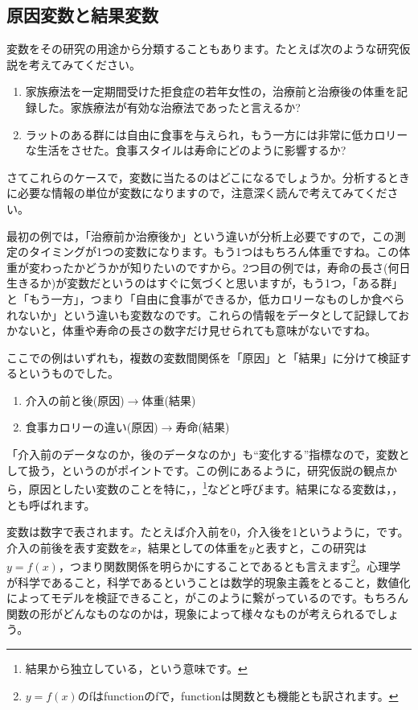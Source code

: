 \documentclass{ltjsbook}
\begin{document}
\subsection{原因変数と結果変数}
変数をその研究の用途から分類することもあります。たとえば次のような研究仮説を考えてみてください。
\begin{enumerate}
	\item 家族療法を一定期間受けた拒食症の若年女性の，治療前と治療後の体重を記録した。家族療法が有効な治療法であったと言えるか? 
	\item ラットのある群には自由に食事を与えられ，もう一方には非常に低カロリーな生活をさせた。食事スタイルは寿命にどのように影響するか? 
\end{enumerate}
さてこれらのケースで，変数に当たるのはどこになるでしょうか。分析するときに必要な情報の単位が変数になりますので，注意深く読んで考えてみてください。

最初の例では，「治療前か治療後か」という違いが分析上必要ですので，この測定のタイミングが1つの変数になります。もう1つはもちろん体重ですね。この体重が変わったかどうかが知りたいのですから。2つ目の例では，寿命の長さ(何日生きるか)が変数だというのはすぐに気づくと思いますが，もう1つ，「ある群」と「もう一方」，つまり「自由に食事ができるか，低カロリーなものしか食べられないか」という違いも変数なのです。これらの情報をデータとして記録しておかないと，体重や寿命の長さの数字だけ見せられても意味がないですね。

ここでの例はいずれも，複数の変数間関係を「原因」と「結果」に分けて検証するというものでした。
\begin{enumerate}
	\item 介入の前と後(原因)$\to$体重(結果)
	\item 食事カロリーの違い(原因)$\to$寿命(結果)
\end{enumerate}
「介入前のデータなのか，後のデータなのか」も``変化する''指標なので，変数として扱う，というのがポイントです。この例にあるように，研究仮説の観点から，原因としたい変数のことを特に，，\footnote{結果から独立している，という意味です。}などと呼びます。結果になる変数は，，とも呼ばれます。

変数は数字で表されます。たとえば介入前を0，介入後を1というように，です。介入の前後を表す変数を$x$，結果としての体重を$y$と表すと，この研究は$y=f(x)$，つまり関数関係を明らかにすることであるとも言えます\footnote{$y=f(x)$のfはfunctionのfで，functionは関数とも機能とも訳されます。}。心理学が科学であること，科学であるということは数学的現象主義をとること，数値化によってモデルを検証できること，がこのように繋がっているのです。もちろん関数の形がどんなものなのかは，現象によって様々なものが考えられるでしょう。
\end{document}
